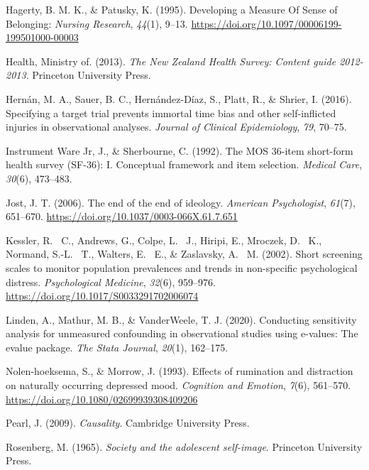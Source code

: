 \documentclass[
  single column]{article}
\newlength{\cslhangindent}
\newenvironment{CSLReferences}[2] %
 {\begin{list}{}{%
  \setlength{\itemindent}{0pt}
  \setlength{\leftmargin}{0pt}
  \setlength{\parsep}{0pt}
  \ifodd #1
   \setlength{\leftmargin}{\cslhangindent}
   \setlength{\itemindent}{-1\cslhangindent}
  \fi
  \setlength{\itemsep}{#2\baselineskip}}}
 {\end{list}}
\begin{document}
\begin{CSLReferences}{1}{0}
Hagerty, B. M. K., \& Patusky, K. (1995). Developing a Measure Of Sense
of Belonging: \emph{Nursing Research}, \emph{44}(1), 9--13.
\url{https://doi.org/10.1097/00006199-199501000-00003}

Health, Ministry of. (2013). \emph{The {N}ew {Z}ealand {H}ealth
{S}urvey: Content guide 2012-2013}. Princeton University Press.

Hernán, M. A., Sauer, B. C., Hernández-Díaz, S., Platt, R., \& Shrier,
I. (2016). Specifying a target trial prevents immortal time bias and
other self-inflicted injuries in observational analyses. \emph{Journal
of Clinical Epidemiology}, \emph{79}, 70--75.

Instrument Ware Jr, J., \& Sherbourne, C. (1992). The MOS 36-item
short-form health survey (SF-36): I. Conceptual framework and item
selection. \emph{Medical Care}, \emph{30}(6), 473--483.

Jost, J. T. (2006). The end of the end of ideology. \emph{American
Psychologist}, \emph{61}(7), 651--670.
\url{https://doi.org/10.1037/0003-066X.61.7.651}

Kessler, R. ~C., Andrews, G., Colpe, L. ~J., Hiripi, E., Mroczek, D.
~K., Normand, S.-L. ~T., Walters, E. ~E., \& Zaslavsky, A. ~M. (2002).
Short screening scales to monitor population prevalences and trends in
non-specific psychological distress. \emph{Psychological Medicine},
\emph{32}(6), 959--976. \url{https://doi.org/10.1017/S0033291702006074}

Linden, A., Mathur, M. B., \& VanderWeele, T. J. (2020). Conducting
sensitivity analysis for unmeasured confounding in observational studies
using e-values: The evalue package. \emph{The Stata Journal},
\emph{20}(1), 162--175.

Nolen-hoeksema, S., \& Morrow, J. (1993). Effects of rumination and
distraction on naturally occurring depressed mood. \emph{Cognition and
Emotion}, \emph{7}(6), 561--570.
\url{https://doi.org/10.1080/02699939308409206}

Pearl, J. (2009). \emph{Causality}. Cambridge University Press.

Rosenberg, M. (1965). \emph{Society and the adolescent self-image}.
Princeton University Press.


\end{CSLReferences}
\end{document}
